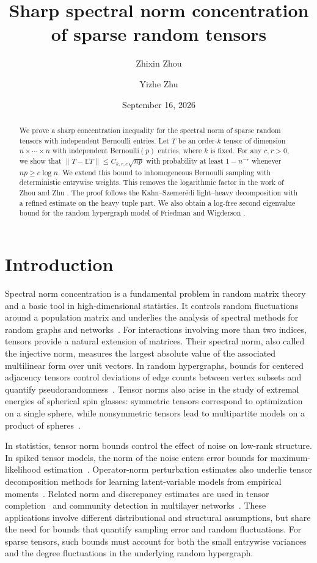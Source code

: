 \documentclass[11pt,reqno]{amsart}
\title{Sharp spectral norm concentration of sparse random tensors}
\author{Zhixin Zhou}
\author{Yizhe Zhu}
\date{September 16, 2026}
\numberwithin{equation}{section}
\theoremstyle{definition}
\theoremstyle{remark}
\newcommand{\E}{\mathbb E}
\begin{document}
\begin{abstract}
We prove a sharp concentration inequality for the spectral
norm of sparse random tensors with independent Bernoulli entries.
Let $T$ be an order-$k$ tensor of dimension $n\times\cdots\times n$
with independent Bernoulli$(p)$ entries, where $k$ is fixed.
For any $c,r>0$, we show that
$\|T-\E T\|\le C_{k,r,c}\sqrt{np}$ with probability at least $1-n^{-r}$
whenever $np\ge c\log n$. We extend this bound
to inhomogeneous Bernoulli sampling with deterministic entrywise weights.
This removes the logarithmic
factor in the work of Zhou and Zhu \cite{ZZ21}. The proof
follows the Kahn--Szemer\'edi light--heavy
decomposition with a refined estimate on the heavy tuple part. We also obtain a log-free second eigenvalue bound for the random hypergraph model of Friedman and Wigderson \cite{FW95}.
\end{abstract}
\maketitle

\section{Introduction}\label{sec:intro}

Spectral norm concentration is a fundamental problem in random matrix
theory and a basic tool in high-dimensional statistics. It controls
random fluctuations around a population matrix and underlies the
analysis of spectral methods for random graphs and networks~\cite{FO05,LR15}.
For interactions involving more than two indices, tensors provide a
natural extension of matrices. Their spectral norm, also called the
injective norm, measures the largest absolute value of the associated
multilinear form over unit vectors. In random hypergraphs, bounds for
centered adjacency tensors control deviations of edge counts between
vertex subsets and quantify pseudorandomness~\cite{FW95,ZZ21}.
Tensor norms also arise in the study of extremal energies of spherical
spin glasses: symmetric tensors correspond to optimization on a
single sphere, while nonsymmetric tensors lead to multipartite models
on a product of spheres~\cite{ABC13,DM24}.

In statistics, tensor norm bounds control the effect of noise on
low-rank structure. In spiked tensor models, the norm of the noise
enters error bounds for maximum-likelihood estimation~\cite{MR14}.
Operator-norm perturbation estimates also underlie tensor
decomposition methods for learning latent-variable models from
empirical moments~\cite{AGHKT14}. Related norm and discrepancy estimates
are used in tensor completion~\cite{HZ21,JO14,YZ17} and community detection
in multilayer networks~\cite{LCL20}. These applications involve
different distributional and structural assumptions, but share the
need for bounds that quantify sampling error and random fluctuations.
For sparse tensors, such bounds must account for both the small
entrywise variances and the  degree fluctuations in the underlying random hypergraph.
\end{document}
